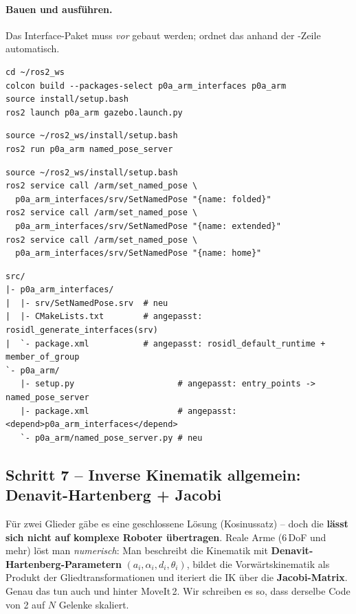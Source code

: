 \paragraph{Bauen und ausführen.} Das Interface-Paket muss \emph{vor}
 gebaut werden;  ordnet das anhand der
-Zeile automatisch.
\begin{lstlisting}[style=bash,caption={Terminal 1 -- bauen + Gazebo-Stack}]
cd ~/ros2_ws
colcon build --packages-select p0a_arm_interfaces p0a_arm
source install/setup.bash
ros2 launch p0a_arm gazebo.launch.py
\end{lstlisting}
\begin{lstlisting}[style=bash,caption={Terminal 2 -- Server bereitstellen}]
source ~/ros2_ws/install/setup.bash
ros2 run p0a_arm named_pose_server
\end{lstlisting}
\begin{lstlisting}[style=bash,caption={Terminal 3 -- Service aufrufen}]
source ~/ros2_ws/install/setup.bash
ros2 service call /arm/set_named_pose \
  p0a_arm_interfaces/srv/SetNamedPose "{name: folded}"
ros2 service call /arm/set_named_pose \
  p0a_arm_interfaces/srv/SetNamedPose "{name: extended}"
ros2 service call /arm/set_named_pose \
  p0a_arm_interfaces/srv/SetNamedPose "{name: home}"
\end{lstlisting}

\begin{lstlisting}[style=bash,caption={\code{ros2\_ws}-Delta nach Schritt 6 (\# neu / \# angepasst)}]
src/
|- p0a_arm_interfaces/
|  |- srv/SetNamedPose.srv  # neu
|  |- CMakeLists.txt        # angepasst: rosidl_generate_interfaces(srv)
|  `- package.xml           # angepasst: rosidl_default_runtime + member_of_group
`- p0a_arm/
   |- setup.py                     # angepasst: entry_points -> named_pose_server
   |- package.xml                  # angepasst: <depend>p0a_arm_interfaces</depend>
   `- p0a_arm/named_pose_server.py # neu
\end{lstlisting}

\subsection{Schritt 7 -- Inverse Kinematik allgemein: Denavit-Hartenberg + Jacobi}
Für zwei Glieder gäbe es eine geschlossene Lösung (Kosinussatz) -- doch die
\textbf{lässt sich nicht auf komplexe Roboter übertragen}. Reale Arme (6\,DoF und
mehr) löst man \emph{numerisch}: Man beschreibt die Kinematik mit
\textbf{Denavit-Hartenberg-Parametern} $(a_i,\alpha_i,d_i,\theta_i)$, bildet die
Vorwärtskinematik als Produkt der Gliedtransformationen und iteriert die IK über
die \textbf{Jacobi-Matrix}. Genau das tun auch \code{KDL} und 
hinter MoveIt\,2. Wir schreiben es so, dass derselbe Code von 2 auf $N$ Gelenke
skaliert.

